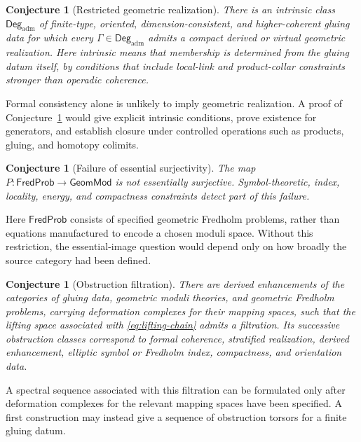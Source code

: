 \documentclass[11pt,letterpaper,twoside]{article}
\theoremstyle{plain}
\newtheorem{conjecture}[theorem]{Conjecture}
\theoremstyle{definition}
\theoremstyle{remark}
\newcommand{\Deg}{\mathsf{Deg}}
\newcommand{\GeomMod}{\mathsf{GeomMod}}
\newcommand{\FredProb}{\mathsf{FredProb}}
\begin{document}
\begin{conjecture}[Restricted geometric realization]\label{conj:geometric}
There is an intrinsic class \(\Deg_{\mathrm{adm}}\) of finite-type, oriented, dimension-consistent, and higher-coherent gluing data for which every \(\Gamma\in\Deg_{\mathrm{adm}}\) admits a compact derived or virtual geometric realization.  Here intrinsic means that membership is determined from the gluing datum itself, by conditions that include local-link and product-collar constraints stronger than operadic coherence.
\end{conjecture}

Formal consistency alone is unlikely to imply geometric realization.  A proof of Conjecture~\ref{conj:geometric} would give explicit intrinsic conditions, prove existence for generators, and establish closure under controlled operations such as products, gluing, and homotopy colimits.

\begin{conjecture}[Failure of essential surjectivity]\label{conj:scarcity}
The map \(P:\FredProb\to\GeomMod\) is not essentially surjective.  Symbol-theoretic, index, locality, energy, and compactness constraints detect part of this failure.
\end{conjecture}

Here \(\FredProb\) consists of specified geometric Fredholm problems, rather than equations manufactured to encode a chosen moduli space.  Without this restriction, the essential-image question would depend only on how broadly the source category had been defined.

\begin{conjecture}[Obstruction filtration]\label{conj:spectral}
There are derived enhancements of the categories of gluing data, geometric moduli theories, and geometric Fredholm problems, carrying deformation complexes for their mapping spaces, such that the lifting space associated with \eqref{eq:lifting-chain} admits a filtration.  Its successive obstruction classes correspond to formal coherence, stratified realization, derived enhancement, elliptic symbol or Fredholm index, compactness, and orientation data.
\end{conjecture}

A spectral sequence associated with this filtration can be formulated only after deformation complexes for the relevant mapping spaces have been specified.  A first construction may instead give a sequence of obstruction torsors for a finite gluing datum.
\end{document}
